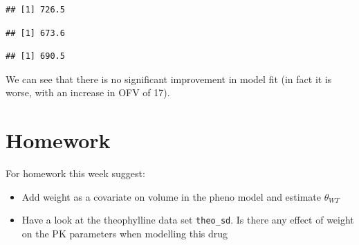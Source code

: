 \documentclass[
]{article}
\newenvironment{Shaded}{\begin{snugshade}}{\end{snugshade}}
\newcommand{\NormalTok}[1]{#1}
\newcommand{\SpecialCharTok}[1]{\textcolor[rgb]{0.81,0.36,0.00}{\textbf{#1}}}
\begin{document}
\begin{Shaded}
\end{Shaded}

\begin{verbatim}
## [1] 726.5
\end{verbatim}

\begin{verbatim}
## [1] 673.6
\end{verbatim}

\begin{verbatim}
## [1] 690.5
\end{verbatim}

We can see that there is no significant improvement in model fit (in fact it is worse, with an increase in OFV of 17).

\newpage

\section{Homework}\label{homework}

For homework this week suggest:

\begin{itemize}
\item
  Add weight as a covariate on volume in the pheno model and estimate \(\theta_{WT}\)
\item
  Have a look at the theophylline data set \texttt{theo\_sd}. Is there any effect of weight on the PK parameters when modelling this drug
\end{itemize}
\end{document}

